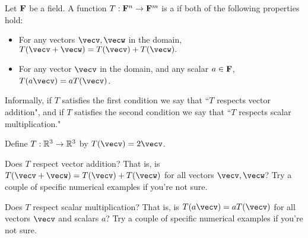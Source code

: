 \endedxvertical








\endedxvertical











{} 
Let ${\bf {F}}$ be a field.  A function $T: {\bf {F}}^n \rightarrow {\bf {F}}^m$ is a {}
if both of the following properties hold:

\begin{itemize}
\item For any vectors $\vecv, \vecw$ in the domain, $T(\vecv + \vecw) = T(\vecv) + T(\vecw).$ 
\item For any vector $\vecv$ in the domain, and any scalar $a\in {\bf {F}}$, $T(a\vecv) = aT(\vecv)$.    
\end{itemize}

Informally, if $T$ satisfies the first condition we say that ``$T$ respects vector addition", and 
if $T$ satisfies the second condition we say that ``$T$ respects scalar multiplication."  

\endedxtext

\endedxvertical






Define $T: \mathbb R^3 \rightarrow \mathbb R^3$ by $T(\vecv) = 2\vecv$.  

Does $T$ respect vector addition?  That is, is $T(\vecv + \vecw) = T(\vecv) + T(\vecw)$ for all 
vectors $\vecv,\vecw$?
Try a couple of specific numerical examples if you're not sure.  


Does $T$ respect scalar multiplication?  
That is, is $T(a\vecv) = aT(\vecv)$ for all vectors $\vecv$ and scalars $a$?
Try a couple of specific numerical examples if you're not sure.  


